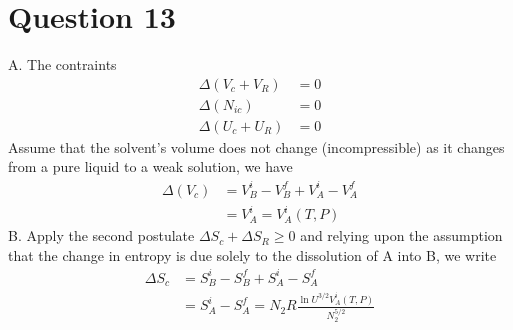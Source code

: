 \documentclass{article}
\numberwithin{equation}{section}
\begin{document}
\section*{Question 13}
A. The contraints
\begin{align*}
\Delta (V_c+V_R)&=0\\
\Delta (N_{ic})&=0\\
\Delta (U_c+U_R)&=0
\end{align*}
Assume that the solvent's volume does not change (incompressible) as it changes from a pure liquid to a weak solution, we have 
\begin{align*}
\Delta (V_c)&=V_B^i-V_B^f+V_A^i-V_A^f\\
&=V_A^i=V_A^i(T,P)
\end{align*}
B. Apply the second postulate $\Delta S_c + \Delta S_R \geq 0$ and relying upon the assumption that the change in entropy is due solely to the dissolution of A into B, we write
\begin{align*}
\Delta S_c&=S_B^i-S_B^f+S_A^i-S_A^f\\
&=S_A^i-S_A^f=N_2R\frac{\ln U^{3/2}V_A^i(T,P)}{N^{5/2}_2}
\end{align*}
\end{document}
